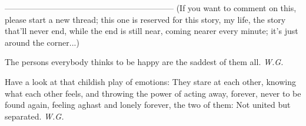 --------------------------------------------------------------
(If you want to comment on this, please start a new thread; this one is reserved for this story, my life, the story that'll never end, while the end is still near, coming nearer every minute; it's just around the corner...)

The persons everybody thinks to be happy
are the saddest of them all. 
\emph{W.G.}

Have a look at that childish play of emotions:
They stare at each other, knowing what each other feels,
and throwing the power of acting
away,
forever,
never to be found again,
feeling aghast and lonely forever,
the two of them:
Not united
but separated. 
\emph{W.G.}
